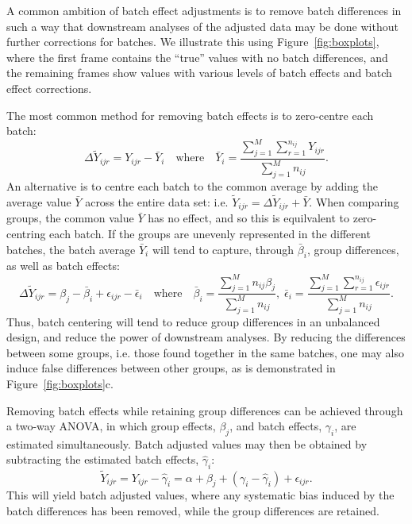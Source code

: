\documentclass{bio}
\begin{document}
A common ambition of batch effect adjustments is to remove batch differences in such a way that downstream analyses of the adjusted data may be done without further corrections for batches. We illustrate this using Figure~\ref{fig:boxplots}, where the first frame contains the ``true'' values with no batch differences, and the remaining frames show values with various levels of batch effects and batch effect corrections.

The most common method for removing batch effects is to zero-centre each batch:
\begin{equation}
\Delta\widetilde Y_{ijr}=Y_{ijr}-\bar{Y}_{i}
\quad\text{where}\quad
\bar{Y}_i=\frac{\sum_{j=1}^M\sum_{r=1}^{n_{ij}} Y_{ijr}}{\sum_{j=1}^M n_{ij}}.
\end{equation}
An alternative is to centre each batch to the common average by adding the average value $\bar{Y}$ across the entire data set: i.e. $\widetilde Y_{ijr}=\Delta\widetilde Y_{ijr}+\bar{Y}$. When comparing groups, the common value $\bar{Y}$ has no effect, and so this is equilvalent to zero-centring each batch. If the groups are unevenly represented in the different batches, the batch average $\bar{Y}_i$ will tend to capture, through $\bar\beta_i$, group differences, as well as batch effects:
\begin{equation}
\Delta\widetilde{Y}_{ijr}=\beta_j-\bar{\beta}_i+\epsilon_{ijr}-\bar{\epsilon}_i
\quad\text{where}\quad
\bar{\beta}_i=\frac{\sum_{j=1}^M n_{ij}\beta_j}{\sum_{j=1}^M n_{ij}},\;
\bar{\epsilon}_i=\frac{\sum_{j=1}^M\sum_{r=1}^{n_{ij}} \epsilon_{ijr}}{\sum_{j=1}^M n_{ij}}.
\end{equation}
Thus, batch centering will tend to reduce group differences in an unbalanced design, and reduce the power of downstream analyses. By reducing the differences between some groups, i.e. those found together in the same batches, one may also induce false differences between other groups, as is demonstrated in Figure~\ref{fig:boxplots}c.

Removing batch effects while retaining group differences can be achieved through a two-way ANOVA, in which group effects, $\beta_j$, and batch effects, $\gamma_i$, are estimated simultaneously. Batch adjusted values may then be obtained by subtracting the estimated batch effects, $\hat\gamma_i$:
\begin{equation}
\widetilde Y_{ijr}=Y_{ijr}-\hat\gamma_i=\alpha+\beta_j+(\gamma_i-\hat\gamma_i)+\epsilon_{ijr}.
\end{equation}
This will yield batch adjusted values, where any systematic bias induced by the batch differences has been removed, while the group differences are retained.
\end{document}
